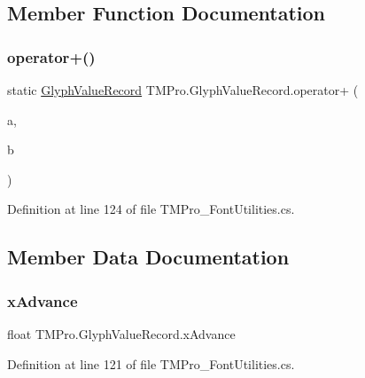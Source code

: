 \subsection{Member Function Documentation}
\mbox{\label{struct_t_m_pro_1_1_glyph_value_record_ab9701cc6920a990edcbc89e0b81e4dbe}} 
\subsubsection{\texorpdfstring{operator+()}{operator+()}}
{\footnotesize\ttfamily static \mbox{\hyperlink{struct_t_m_pro_1_1_glyph_value_record}{Glyph\+Value\+Record}} T\+M\+Pro.\+Glyph\+Value\+Record.\+operator+ (\begin{DoxyParamCaption}\item[{\mbox{\hyperlink{struct_t_m_pro_1_1_glyph_value_record}{Glyph\+Value\+Record}}}]{a,  }\item[{\mbox{\hyperlink{struct_t_m_pro_1_1_glyph_value_record}{Glyph\+Value\+Record}}}]{b }\end{DoxyParamCaption})\hspace{0.3cm}{\ttfamily [static]}}



Definition at line 124 of file T\+M\+Pro\+\_\+\+Font\+Utilities.\+cs.



\subsection{Member Data Documentation}
\mbox{\label{struct_t_m_pro_1_1_glyph_value_record_abfd29f327c97832feec2d9b3e2bb7abc}} 
\subsubsection{\texorpdfstring{xAdvance}{xAdvance}}
{\footnotesize\ttfamily float T\+M\+Pro.\+Glyph\+Value\+Record.\+x\+Advance}



Definition at line 121 of file T\+M\+Pro\+\_\+\+Font\+Utilities.\+cs.

